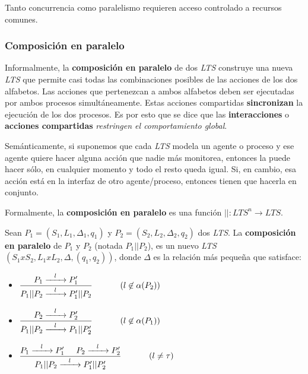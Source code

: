 \documentclass[]{article}
\begin{document}
Tanto concurrencia como paralelismo requieren acceso controlado a recursos comunes.

\subsubsection{Composición en paralelo}
Informalmente, la \textbf{composición en paralelo} de dos \textit{LTS} construye una nueva \textit{LTS} que permite casi todas las combinaciones posibles de las acciones de los dos alfabetos. Las acciones que pertenezcan a ambos alfabetos deben ser ejecutadas por ambos procesos simultáneamente. Estas acciones compartidas \textbf{sincronizan} la ejecución de los dos procesos. Es por esto que se dice que las \textbf{interacciones} o \textbf{acciones compartidas} \textit{restringen el comportamiento global}.

Semánticamente, si suponemos que cada \textit{LTS} modela un agente o proceso y ese agente quiere hacer alguna acción que nadie más monitorea, entonces la puede hacer sólo, en cualquier momento y todo el resto queda igual. Si, en cambio, esa acción está en la interfaz de otro agente/proceso, entonces tienen que hacerla en conjunto.
~\newline

Formalmente, la \textbf{composición en paralelo} es una función $|| : LTS^n \rightarrow LTS$.

Sean $P_1 = (S_1,L_1,\Delta_1,q_1)$ y $P_2 = (S_2,L_2,\Delta_2,q_2)$ dos \textit{LTS}. La \textbf{composición en paralelo} de $P_1$ y $P_2$ (notada $P_1 || P_2$), es un nuevo \textit{LTS} $(S_1xS_2,L_1xL_2,\Delta,(q_1,q_2))$, donde $\Delta$ es la relación más pequeña que satisface:
\begin{multicols}{2}
\begin{itemize}
	\item $\displaystyle \frac{P_1 \xrightarrow{\hspace*{0.3cm} l \hspace*{0.3cm}} P_1'}{P_1||P_2 \xrightarrow{\hspace*{0.3cm} l \hspace*{0.3cm}} P_1'||P_2}$  $\hspace*{1cm}(l\not\in\alpha(P_2))$
	\item $\displaystyle \frac{P_2 \xrightarrow{\hspace*{0.3cm} l \hspace*{0.3cm}} P_2'}{P_1||P_2 \xrightarrow{\hspace*{0.3cm} l \hspace*{0.3cm}} P_1||P_2'}$  $\hspace*{1cm}(l\not\in\alpha(P_1))$
	\item $\displaystyle \frac{P_1 \xrightarrow{\hspace*{0.3cm} l \hspace*{0.3cm}} P_1' \hspace*{0.5cm} P_2 \xrightarrow{\hspace*{0.3cm} l \hspace*{0.3cm}} P_2'}{P_1||P_2 \xrightarrow{\hspace*{0.3cm} l \hspace*{0.3cm}} P_1'||P_2'}$  $\hspace*{1cm}(l\neq\tau)$
\end{itemize}
\end{multicols}
\end{document}
